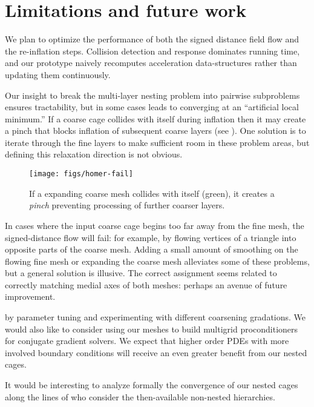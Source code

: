 \section{Limitations and future work}
\label{sec:conclusion}
%
We plan to optimize the performance of both the signed distance field flow and
the re-inflation steps.
%
Collision detection and response dominates running time, and our prototype
naively recomputes acceleration data-structures rather than updating them
continuously.

Our insight to break the multi-layer nesting problem into pairwise subproblems
ensures tractability, but in some cases leads to converging at an
``artificial local minimum.'' If a coarse cage collides with itself during
inflation then it may create a pinch that blocks inflation of subsequent coarse
layers (see ).
%
One solution is to iterate through the fine layers to make sufficient room in
these problem areas, but defining this relaxation direction is not obvious.

\begin{figure}
  \texttt{[image: figs/homer-fail]}
  \caption{If a expanding coarse mesh collides with itself (green), it creates
  a \emph{pinch} preventing processing of further coarser layers.}
  \label{fig:homer}
\end{figure}

In cases where the input coarse cage begins too far away from the fine mesh,
the signed-distance flow will fail: for example, by flowing vertices of a
triangle into opposite parts of the coarse mesh. 
%
Adding a small amount of smoothing on the flowing fine mesh or expanding the
coarse mesh alleviates some of these problems, but a general solution is
illusive.
%
The correct assignment seems related to correctly matching medial axes of both
meshes: perhaps an avenue of future improvement.

 by parameter tuning and experimenting with different coarsening
gradations. We would also like to consider using our meshes to build
multigrid proconditioners for conjugate gradient solvers.
%
We expect that higher order PDEs with more involved boundary conditions will
receive an even greater benefit from our nested cages.

It would be interesting to analyze formally the convergence of our nested cages
along the lines of \cite{chan1996convergence} who consider the then-available
non-nested hierarchies.

